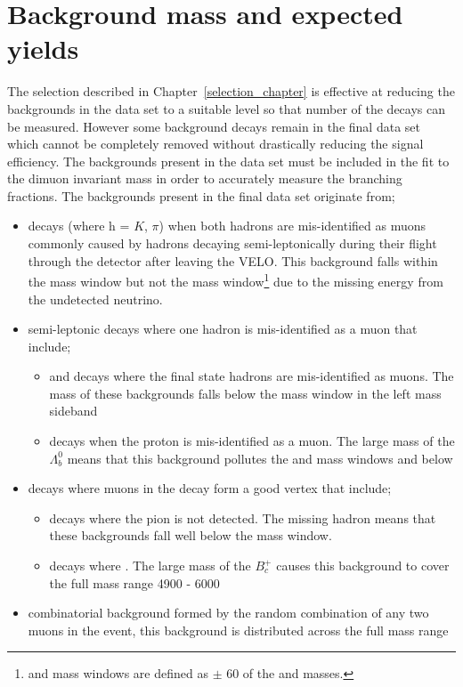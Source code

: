 \section{Background mass \pdfs and expected yields}
\label{sec:backgrounds}
The selection described in Chapter~\ref{selection_chapter} is effective at reducing the backgrounds in the data set to a suitable level so that number of the \bmumu decays can be measured. However some background decays remain in the final data set which cannot be completely removed without drastically reducing the signal efficiency. The backgrounds present in the data set must be included in the fit to the dimuon invariant mass in order to accurately measure the \bmumu branching fractions. The backgrounds present in the final data set originate from;
\begin{itemize}
\item \bhh decays (where h = $K$, $\pi$) when both hadrons are mis-identified as muons commonly caused by hadrons decaying semi-leptonically during their flight through the detector after leaving the VELO. This background falls within the \bd mass window but not the \bs mass window\footnote{\bd and \bs mass windows are defined as $\pm$ 60 \mevcc of the \bd and \bs masses.} due to the missing energy from the undetected neutrino. 
\item semi-leptonic decays where one hadron is mis-identified as a muon that include;
\begin{itemize}
\item \bdpimunu and \bsKmunu decays where the final state hadrons are mis-identified as muons. The mass of these backgrounds falls below the \bd mass window in the left mass sideband
\item \lambdab decays when the proton is mis-identified as a muon. The large mass of the $\Lambda^{0}_{b}$ means that this background pollutes the \bs and \bd mass windows and below
\end{itemize}
\item decays where muons in the decay form a good vertex that include;
\begin{itemize}
\item \bpimumu decays where the pion is not detected. The missing hadron means that these backgrounds fall well below the \bd mass window.
\item \bcjpsimunu decays where \jpsimumu. The large mass of the $B^{+}_{c}$ causes this background to cover the full mass range 4900 - 6000 \mevcc
\end{itemize}
\item combinatorial background formed by the random combination of any two muons in the event, this background is distributed across the full mass range
\end{itemize}

